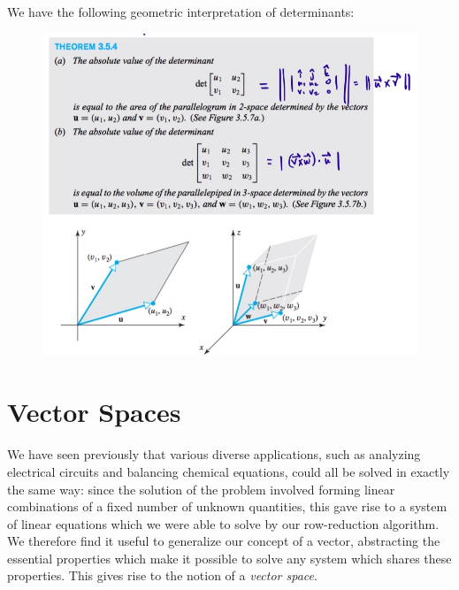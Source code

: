 \documentclass[12pt,letterpaper,reqno]{article}
\numberwithin{equation}{section}
\begin{document}
\begin{prop}
We have the following geometric interpretation of determinants:
	\begin{figure}[h]
			\begin{center}
				\includegraphics[scale=0.4]{figures_mvc/whole_enchilada}
			\end{center}
	\end{figure}
\end{prop}

\section{Vector Spaces}
We have seen previously that various diverse applications, such as analyzing electrical circuits and balancing chemical equations, could all be solved in exactly the same way: since the solution of the problem involved forming linear combinations of a fixed number of unknown quantities, this gave rise to a system of linear equations which we were able to solve by our row-reduction algorithm. We therefore find it useful to generalize our concept of a vector, abstracting the essential properties which make it possible to solve any system which shares these properties. This gives rise to the notion of a \emph{vector space}.
\end{document}
